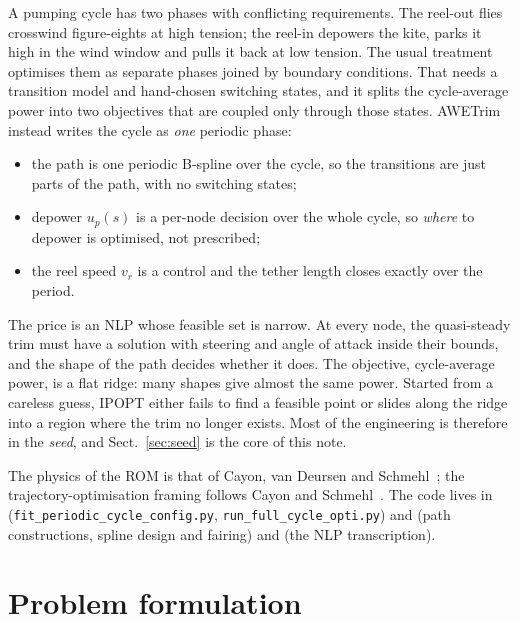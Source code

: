 \documentclass[11pt,a4paper]{article}
\newcommand{\code}[1]{\texttt{\small #1}}
\begin{document}
A pumping cycle has two phases with conflicting requirements. The reel-out flies
crosswind figure-eights at high tension; the reel-in depowers the kite, parks
it high in the wind window and pulls it back at low tension. The usual
treatment optimises them as separate phases joined by boundary conditions.
That needs a transition model and hand-chosen switching states, and it splits
the cycle-average power into two objectives that are coupled only through those
states. AWETrim instead writes the cycle as \emph{one} periodic phase:
\begin{itemize}
  \item the path is one periodic B-spline over the cycle, so the transitions
        are just parts of the path, with no switching states;
  \item depower $u_p(s)$ is a per-node decision over the whole cycle, so
        \emph{where} to depower is optimised, not prescribed;
  \item the reel speed $v_r$ is a control and the tether length closes
        exactly over the period.
\end{itemize}
The price is an NLP whose feasible set is narrow. At every node, the
quasi-steady trim must have a solution with steering and angle of attack
inside their bounds, and the shape of the path decides whether it does. The
objective, cycle-average power, is a flat ridge: many shapes give almost the
same power. Started from a careless guess, IPOPT either fails to find
a feasible point or slides along the ridge into a region where the trim no
longer exists. Most of the engineering is therefore in the \emph{seed},
and Sect.~\ref{sec:seed} is the core of this note.

The physics of the ROM is that of Cayon, van Deursen and
Schmehl~\cite{cayon2026rom}; the trajectory-optimisation framing follows
Cayon and Schmehl~\cite{cayon2026torque}. The code lives in
(\code{fit\_periodic\_cycle\_config.py}, \code{run\_full\_cycle\_opti.py}) and
 (path constructions,
spline design and fairing) and 
(the NLP transcription).

\section{Problem formulation}
\label{sec:problem}
\end{document}
